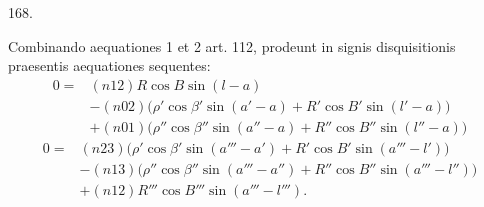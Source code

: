 \par{}\medskip
\begin{center}\hypertarget{native-231-article168}{}168.\end{center}
Combinando aequationes 1 et 2 art. 112, prodeunt in signis disquisitionis praesentis aequationes sequentes:
\[
\begin{aligned}
0={}&(n12)R\cos B\sin(l-a)\\
&-(n02)\bigl(\rho'\cos\beta'\sin(a'-a)+R'\cos B'\sin(l'-a)\bigr)\\
&+(n01)\bigl(\rho''\cos\beta''\sin(a''-a)+R''\cos B''\sin(l''-a)\bigr)
\end{aligned}
\]
\[
\begin{aligned}
0={}&(n23)\bigl(\rho'\cos\beta'\sin(a'''-a')+R'\cos B'\sin(a'''-l')\bigr)\\
&-(n13)\bigl(\rho''\cos\beta''\sin(a'''-a'')+R''\cos B''\sin(a'''-l'')\bigr)\\
&+(n12)R'''\cos B'''\sin(a'''-l''').
\end{aligned}
\]

